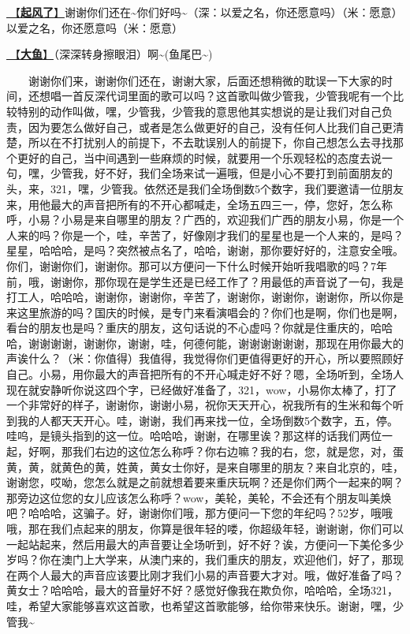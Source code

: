 \documentclass[]{ctexbook}
\begin{document}
\hyperref[the-wind-rises]{🎵【\textbf{起风了}】}谢谢你们还在\textasciitilde 你们好吗\textasciitilde（深：以爱之名，你还愿意吗）（米：愿意）以爱之名，你还愿意吗（米：愿意）

\hyperref[big-fish]{🎵【\textbf{大鱼}】}（深深转身擦眼泪）啊\textasciitilde(鱼尾巴\textasciitilde)

  谢谢你们来，谢谢你们还在，谢谢大家，后面还想稍微的耽误一下大家的时间，还想唱一首反深代词里面的歌可以吗？这首歌叫做少管我，少管我呢有一个比较特别的动作叫做，嘿，少管我，少管我的意思他其实想说的是让我们对自己负责，因为要怎么做好自己，或者是怎么做更好的自己，没有任何人比我们自己更清楚，所以在不打扰别人的前提下，不去耽误别人的前提下，你自己想怎么去寻找那个更好的自己，当中间遇到一些麻烦的时候，就要用一个乐观轻松的态度去说一句，嘿，少管我，好不好，我们全场来试一遍哦，但是小心不要打到前面朋友的头，来，321，嘿，少管我。依然还是我们全场倒数5个数字，我们要邀请一位朋友来，用他最大的声音把所有的不开心都喊走，全场五四三一，停，您好，怎么称呼，小易？小易是来自哪里的朋友？广西的，欢迎我们广西的朋友小易，你是一个人来的吗？你是一个，哇，辛苦了，好像刚才我们的星星也是一个人来的，是吗？星星，哈哈哈，是吗？突然被点名了，哈哈，谢谢，那你要好好的，注意安全哦。你们，谢谢你们，谢谢你。那可以方便问一下什么时候开始听我唱歌的吗？7年前，哦，谢谢你，那你现在是学生还是已经工作了？用最低的声音说了一句，我是打工人，哈哈哈，谢谢你，谢谢你，辛苦了，谢谢你，谢谢你，谢谢你，所以你是来这里旅游的吗？国庆的时候，是专门来看演唱会的？你们也是啊，你们也是啊，看台的朋友也是吗？重庆的朋友，这句话说的不心虚吗？你就是住重庆的，哈哈哈，谢谢谢谢，谢谢你，谢谢，哇，何德何能，谢谢谢谢谢谢，那现在用你最大的声诶什么？（米：你值得）我值得，我觉得你们更值得更好的开心，所以要照顾好自己。小易，用你最大的声音把所有的不开心喊走好不好？嗯，全场听到，全场人现在就安静听你说这四个字，已经做好准备了，321，wow，小易你太棒了，打了一个非常好的样子，谢谢你，谢谢小易，祝你天天开心，祝我所有的生米和每个听到我的人都天天开心。哇，谢谢，我们再来找一位，全场倒数5个数字，五，停。哇呜，是镜头指到的这一位。哈哈哈，谢谢，在哪里诶？那这样的话我们两位一起，好啊，那我们右边的这位怎么称呼？你右边嘛？我的右，您，就是您，对，蛋黄，黄，就黄色的黄，姓黄，黄女士你好，是来自哪里的朋友？来自北京的，哇，谢谢您，哎呦，您怎么就是之前就想着要来重庆玩啊？还是你们两个一起来的啊？那旁边这位您的女儿应该怎么称呼？wow，美轮，美轮，不会还有个朋友叫美焕吧？哈哈哈，这骗子。好，谢谢你们哦，那方便问一下您的年纪吗？52岁，哦哦哦，那在我们点起来的朋友，你算是很年轻的喽，你超级年轻，谢谢谢，你们可以一起站起来，然后用最大的声音要让全场听到，好不好？诶，方便问一下美伦多少岁吗？你在澳门上大学来，从澳门来的，我们重庆的朋友，欢迎他们，好了，那现在两个人最大的声音应该要比刚才我们小易的声音要大才对。哦，做好准备了吗？黄女士？哈哈哈，最大的音量好不好？感觉好像我在欺负你，哈哈哈，全场321，哇，希望大家能够喜欢这首歌，也希望这首歌能够，给你带来快乐。谢谢，嘿，少管我\textasciitilde{}
\end{document}
